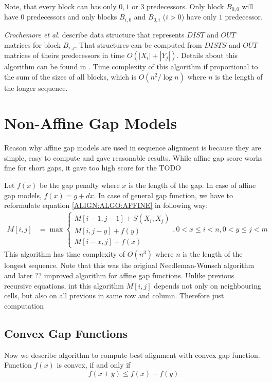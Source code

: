Note, that every block can has only $0,1$ or $3$ predecessors. Only block
$B_{0,0}$ will have $0$ predecessors and only blocks $B_{i,0}$ and $B_{0,i}$
($i>0$) have only $1$ predecessor.  

{\it Crochemore et al.} describe data structure that represents $DIST$ and $OUT$
matrices for block \nocite{Crochemore2002} $B_{i,j}$. That structures can be
computed from $DISTS$ and $OUT$ matrices of theirs predecessors in time
$O(|X_i|+|Y_j|)$. Details about this algorithm can be found in
\cite{Crochemore2002}. Time complexity of this algorithm if proportional to the
sum of the sizes of all blocks, which is $O(n^2/\log n)$ where $n$ is the length
of the longer sequence.



\section{Non-Affine Gap Models} 

Reason why affine gap models are used in sequence alignment is because they are
simple, easy to compute and gave reasonable results. While affine gap score
works fine for short gaps, it gave too high score for the TODO

Let $f(x)$ be the gap penalty where $x$ is the length of the gap. In case of
affine gap models, $f(x)=g+dx$. In case of general gap function, we have to
reformulate equation \ref{ALIGN:ALGO:AFFINE} in following way:
\begin{align}
M[i,j] &= \max
\begin{cases}
 M[i-1,j-1]+S(X_i,X_j)\\
 M[i,j-y]+f(y)\\
 M[i-x,j]+f(x)
\end{cases}, 0<x\leq i<n,0<y\leq j<m
\end{align}
This algorithm has time complexity of $O(n^3)$ where $n$ is the length of the
longest sequence. Note that this was the original Needleman-Wunsch\cite{}
algorithm and later ?? improved algorithm for affine gap functions\cite{}.
Unlike previous recursive equations, int this algorithm $M[i,j]$ depends not
only on neighbouring cells, but also on all previous in same row and column.
Therefore just computation 

\subsection{Convex Gap Functions}

Now we describe algorithm to compute best alignment with convex gap function.
Function $f(x)$ is convex, if and only if
\[f(x+y)\leq f(x)+f(y)\]
 



